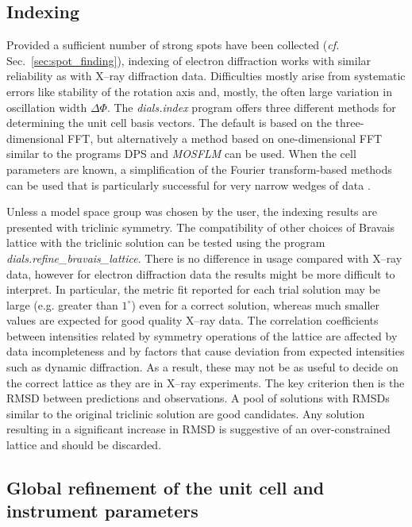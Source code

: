 \documentclass[preprint]{iucr}
\newcommand{\dialsindex}{\emph{dials.index}\xspace}
\newcommand{\dialsrefinebravaislattice}{\emph{dials.refine\_bravais\_lattice}\xspace}
\newcommand{\mosflm}{\emph{MOSFLM}\xspace}
\begin{document}
\subsection{Indexing}

Provided a sufficient number of strong spots have been collected (\emph{cf.}
Sec.~\ref{sec:spot_finding}), indexing of electron diffraction works with
similar reliability as with X--ray diffraction data. Difficulties mostly arise
from systematic errors like stability of the rotation axis and, mostly, the
often large variation in oscillation width $\Delta \Phi$.  The \dialsindex
program offers three different methods for determining the unit cell basis
vectors. The default is based on the three-dimensional FFT, but alternatively a
method based on one-dimensional FFT similar to the programs DPS
\cite{Steller1997} and \mosflm \cite{leslie2007} can be used. When the cell
parameters are known, a simplification of the Fourier transform-based methods
can be used that is particularly successful for very narrow wedges of data
\cite{Gildea2014}.

Unless a model space group was chosen by the user, the indexing results are
presented with triclinic symmetry. The compatibility of other choices of
Bravais lattice with the triclinic solution can be tested using the program
\dialsrefinebravaislattice \cite{Winter2018,Sauter2006}. There is no difference
in usage compared with X--ray data, however for electron diffraction data the
results might be more difficult to interpret. In particular, the metric fit
reported for each trial solution \cite{LePage1982} may be large (e.g. greater
than $1^\circ$) even for a correct solution, whereas much smaller values are
expected for good quality X--ray data. The correlation coefficients between
intensities related by symmetry operations of the lattice are affected by data
incompleteness and by factors that cause deviation from expected intensities
such as dynamic diffraction. As a result, these may not be as useful to decide
on the correct lattice as they are in X--ray experiments. The key criterion then
is the RMSD between predictions and observations. A pool of solutions with
RMSDs similar to the original triclinic solution are good candidates. Any
solution resulting in a significant increase in RMSD is suggestive of an
over-constrained lattice and should be discarded.

\subsection{Global refinement of the unit cell and instrument parameters
\label{sec:refinement}}
\end{document}
